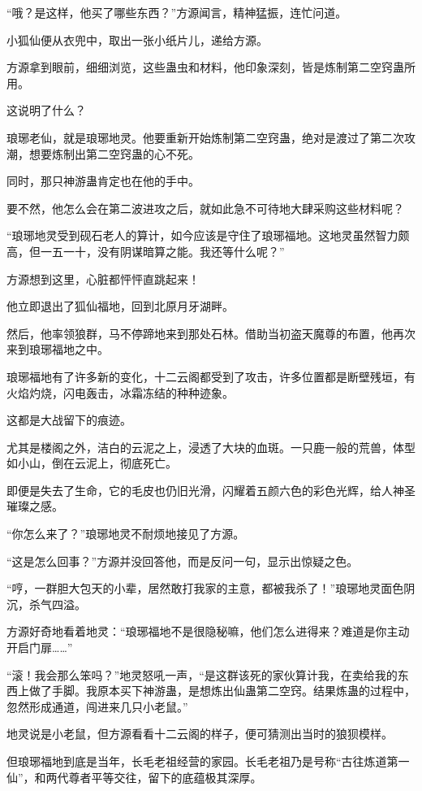 \begin{this_body}
“哦？是这样，他买了哪些东西？”方源闻言，精神猛振，连忙问道。

小狐仙便从衣兜中，取出一张小纸片儿，递给方源。

方源拿到眼前，细细浏览，这些蛊虫和材料，他印象深刻，皆是炼制第二空窍蛊所用。

这说明了什么？

琅琊老仙，就是琅琊地灵。他要重新开始炼制第二空窍蛊，绝对是渡过了第二次攻潮，想要炼制出第二空窍蛊的心不死。

同时，那只神游蛊肯定也在他的手中。

要不然，他怎么会在第二波进攻之后，就如此急不可待地大肆采购这些材料呢？

“琅琊地灵受到砚石老人的算计，如今应该是守住了琅琊福地。这地灵虽然智力颇高，但一五一十，没有阴谋暗算之能。我还等什么呢？”

方源想到这里，心脏都怦怦直跳起来！

他立即退出了狐仙福地，回到北原月牙湖畔。

然后，他率领狼群，马不停蹄地来到那处石林。借助当初盗天魔尊的布置，他再次来到琅琊福地之中。

琅琊福地有了许多新的变化，十二云阁都受到了攻击，许多位置都是断壁残垣，有火焰灼烧，闪电轰击，冰霜冻结的种种迹象。

这都是大战留下的痕迹。

尤其是楼阁之外，洁白的云泥之上，浸透了大块的血斑。一只鹿一般的荒兽，体型如小山，倒在云泥上，彻底死亡。

即便是失去了生命，它的毛皮也仍旧光滑，闪耀着五颜六色的彩色光辉，给人神圣璀璨之感。

“你怎么来了？”琅琊地灵不耐烦地接见了方源。

“这是怎么回事？”方源并没回答他，而是反问一句，显示出惊疑之色。

“哼，一群胆大包天的小辈，居然敢打我家的主意，都被我杀了！”琅琊地灵面色阴沉，杀气四溢。

方源好奇地看着地灵：“琅琊福地不是很隐秘嘛，他们怎么进得来？难道是你主动开启门扉……”

“滚！我会那么笨吗？”地灵怒吼一声，“是这群该死的家伙算计我，在卖给我的东西上做了手脚。我原本买下神游蛊，是想炼出仙蛊第二空窍。结果炼蛊的过程中，忽然形成通道，闯进来几只小老鼠。”

地灵说是小老鼠，但方源看看十二云阁的样子，便可猜测出当时的狼狈模样。

但琅琊福地到底是当年，长毛老祖经营的家园。长毛老祖乃是号称“古往炼道第一仙”，和两代尊者平等交往，留下的底蕴极其深厚。


\end{this_body}
